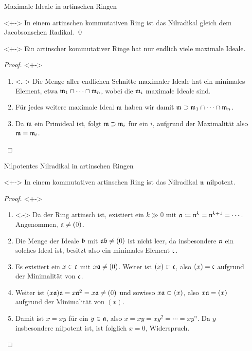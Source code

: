 \begin{frame}{Maximale Ideale in artinschen Ringen}
	\begin{corollary}<+->
		In einem artinschen kommutativen Ring ist das Nilradikal gleich dem
		Jacobsonschen Radikal.
		\qed
	\end{corollary}
	\begin{proposition}<+->
		Ein artinscher kommutativer Ringe hat nur endlich viele maximale Ideale.
	\end{proposition}
	\begin{proof}<+->
		\begin{enumerate}[<+->]
		\item<.->
			Die Menge aller endlichen Schnitte maximaler Ideale hat ein minimales
			Element, etwa \(\mathfrak{m}_1 \cap \dotsb \cap \mathfrak{m}_n\), wobei die
			\(\mathfrak{m}_i\) maximale Ideale sind.
		\item
			Für jedes weitere maximale Ideal
			\(\mathfrak{m}\) haben wir damit \(\mathfrak{m} \supset
			\mathfrak{m}_1 \cap \dotsb \cap \mathfrak{m}_n\).
		\item
			Da \(\mathfrak{m}\) ein Primideal
			ist, folgt \(\mathfrak{m} \supset \mathfrak{m}_i\) für ein \(i\), aufgrund
			der Maximalität also \(\mathfrak{m} = \mathfrak{m}_i\).
			\qedhere
		\end{enumerate}
	\end{proof}
\end{frame}

\begin{frame}{Nilpotentes Nilradikal in artinschen Ringen}
	\begin{proposition}<+->
		In einem kommutativen artinschen Ring ist das Nilradikal \(\mathfrak{n}\)
		nilpotent.
	\end{proposition}
	\begin{proof}<+->
		\begin{enumerate}[<+->]
		\item<.->
			Da der Ring artinsch ist, existiert ein \(k \gg 0\) mit
			\(\mathfrak{a} \coloneqq \mathfrak{n}^k = \mathfrak{n}^{k + 1} = \dotsb\).
			Angenommen, \(\mathfrak{a} \neq (0)\).
		\item
			Die Menge der Ideale \(\mathfrak{b}\) mit \(\mathfrak{a} \mathfrak{b} \neq (0)\)
			ist nicht leer, da insbesondere \(\mathfrak{a}\) ein solches Ideal ist,
			besitzt also ein minimales Element \(\mathfrak{c}\).
		\item
			Es existiert ein \(x \in \mathfrak{c}\) mit \(x \mathfrak{a} \neq (0)\).
			Weiter ist \((x) \subset \mathfrak{c}\), also \((x) = \mathfrak{c}\)
			aufgrund der Minimalität von \(\mathfrak{c}\).
		\item
			Weiter ist \((x \mathfrak{a}) \mathfrak{a} = x \mathfrak{a}^2 = x \mathfrak{a}
			\neq (0)\) und sowieso \(x \mathfrak{a} \subset (x)\), also
			\(x \mathfrak{a} = (x)\) aufgrund der Minimalität von \((x)\).
		\item
			Damit ist \(x = xy\) für ein \(y \in \mathfrak{a}\), also
			\(x = xy = xy^2 = \dotsb = xy^n\). Da \(y\) insbesondere nilpotent
			ist, ist folglich \(x = 0\), Widerspruch.
			\qedhere
		\end{enumerate}
	\end{proof}
\end{frame}

